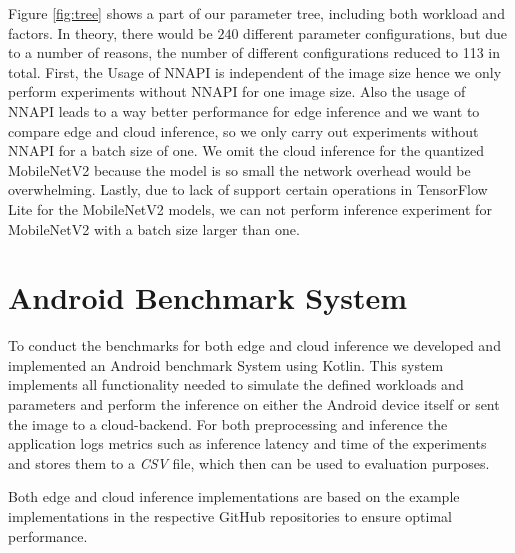 \vspace{15pt}
Figure \ref{fig:tree} shows a part of our parameter tree, including both workload and factors. In theory, there would be $240$ different parameter configurations, but due to a number of reasons, the number of different configurations reduced to 113 in total.
First, the Usage of NNAPI is independent of the image size hence we only perform experiments without NNAPI for one image size. Also the usage of NNAPI leads to a way better performance for edge inference and we want to compare edge and cloud inference, so we only carry out experiments without NNAPI for a batch size of one.
We omit the cloud inference for the quantized MobileNetV2 because the model is so small the network overhead would be overwhelming.%
Lastly, due to lack of support certain operations in TensorFlow Lite for the MobileNetV2 models, we can not perform inference experiment for MobileNetV2 with a batch size larger than one.

\section{Android Benchmark System}
\label{chap:androidApp}
To conduct the benchmarks for both edge and cloud inference we developed and implemented an Android benchmark System using Kotlin.
This system implements all functionality needed to simulate the defined workloads and parameters and perform the inference on either the Android device itself or sent the image to a cloud-backend.
For both preprocessing and inference the application logs metrics such as inference latency and time of the experiments and stores them to a \emph{CSV} file, which then can be used to evaluation purposes.

Both edge and cloud inference implementations are based on the example implementations in the respective GitHub repositories to ensure optimal performance. 



